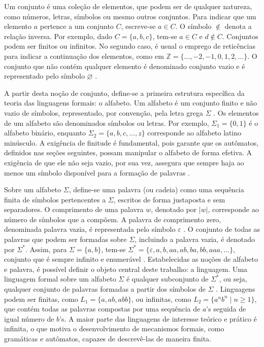 \documentclass[
    12pt
    ,oneside
    ,a4paper
    ,chapter=TITLE
    ,section=TITLE
    ,sumario=abnt-6027-2012]{abntex2}
\begin{document}
Um conjunto é uma coleção de elementos, que podem ser de qualquer natureza, como
números, letras, símbolos ou mesmo outros conjuntos. Para indicar que um elemento $a$ pertence a um conjunto
$C$, escreve-se $a \in C$. O símbolo $\notin$ denota a relação inversa. Por exemplo, dado
$C = \{a, b, c\}$, tem-se $a \in C$ e $d \notin C$. Conjuntos podem ser finitos ou infinitos. No
segundo caso, é usual o emprego de reticências para indicar a continuação dos elementos, como em
$\mathbb{Z} = \{\ldots, -2, -1, 0, 1, 2, \ldots\}$. O conjunto que não contém qualquer elemento é
denominado conjunto vazio e é representado pelo símbolo $\varnothing$ \cite{sipser2012}.

A partir desta noção de conjunto, define-se a primeira estrutura específica da teoria das
linguagens formais: o alfabeto. Um alfabeto é um conjunto finito e não vazio de símbolos,
representado, por convenção, pela letra grega $\Sigma$ \cite{sipser2012}. Os elementos de um
alfabeto são denominados símbolos ou letras. Por exemplo, $\Sigma_1 = \{0, 1\}$ é o alfabeto
binário, enquanto $\Sigma_2 = \{a, b, c, \ldots, z\}$ corresponde ao alfabeto latino minúsculo. A
exigência de finitude é fundamental, pois garante que os autômatos, definidos nas seções
seguintes, possam manipular o alfabeto de forma efetiva. A exigência de que ele não seja vazio, por sua vez, assegura
que sempre haja ao menos um símbolo disponível para a formação de palavras
\cite{diverio2011,vieira2004}.

Sobre um alfabeto $\Sigma$, define-se uma palavra (ou cadeia) como uma sequência finita
de símbolos pertencentes a $\Sigma$, escritos de forma justaposta e sem separadores. O comprimento
de uma palavra $w$, denotado por $|w|$, corresponde ao número de símbolos que a compõem. A palavra
de comprimento zero, denominada palavra vazia, é representada pelo símbolo $\varepsilon$
\cite{sipser2012}. O conjunto de todas as palavras que podem ser formadas sobre $\Sigma$,
incluindo a palavra vazia, é denotado por $\Sigma^*$. Assim, para $\Sigma = \{a, b\}$, tem-se
$\Sigma^* = \{\varepsilon, a, b, aa, ab, ba, bb, aaa, \ldots\}$, conjunto que é sempre infinito e
enumerável \cite{vieira2004}.
Estabelecidas as noções de alfabeto e palavra, é possível definir o objeto central deste trabalho:
a linguagem. Uma linguagem formal sobre um alfabeto $\Sigma$ é qualquer subconjunto de
$\Sigma^*$, ou seja, qualquer conjunto de palavras formadas a partir dos símbolos de $\Sigma$
\cite{sipser2012,vieira2004}. Linguagens podem ser finitas, como $L_1 = \{a, ab, abb\}$, ou
infinitas, como $L_2 = \{a^n b^n \mid n \geq 1\}$, que contém todas as palavras compostas por uma
sequência de $a$'s seguida de igual número de $b$'s. A maior parte das linguagens de interesse
teórico e prático é infinita, o que motiva o desenvolvimento de mecanismos formais, como
gramáticas e autômatos, capazes de descrevê-las de maneira finita.
\end{document}
